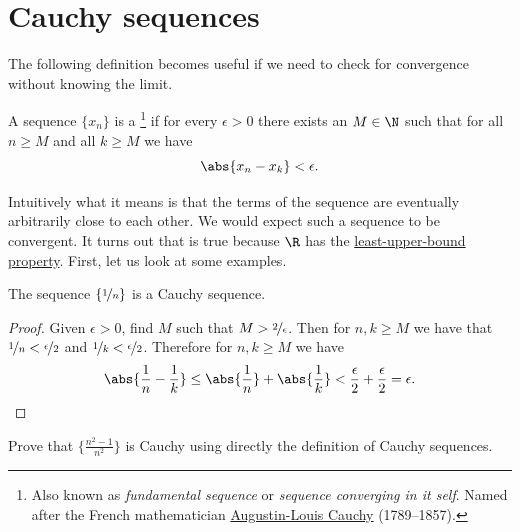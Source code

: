 \documentclass[12pt]{book}
\begin{document}

\sectionnewpage
\section{Cauchy sequences}
\label{sec:cauchy}

The following definition becomes useful if we need to check for convergence without knowing the limit.

\begin{defn}
A sequence $\{ x_n \}$ is a \emph{}%
\footnote{%
Also known as \emph{fundamental sequence} or \emph{sequence converging in it self}. 
Named after the French mathematician
\href{http://en.wikipedia.org/wiki/Cauchy}{Augustin-Louis Cauchy} (1789--1857).} if
for every $\epsilon > 0$ there exists an $M \in \N$ such that
for all $n \geq M$ and all $k \geq M$ we have
\begin{equation*}
\abs{x_n - x_k} < \epsilon .
\end{equation*}
\end{defn}

Intuitively what it means is that the terms of the sequence are eventually
arbitrarily close to each other.
We would expect such a sequence to be
convergent.
It turns out that is true because $\R$ has the
\hyperref[defn:lub]{least-upper-bound property}.
First, let us look at some examples.

\begin{example}
The sequence $\{ \nicefrac{1}{n} \}$ is a Cauchy sequence.

\begin{proof}  Given $\epsilon > 0$, find $M$ such that
$M > \nicefrac{2}{\epsilon}$.
Then for $n,k \geq M$
we have that $\nicefrac{1}{n} < \nicefrac{\epsilon}{2}$
and
$\nicefrac{1}{k} < \nicefrac{\epsilon}{2}$.
Therefore for $n, k \geq M$
we have
\begin{equation*}
\abs{\frac{1}{n} - \frac{1}{k}}
\leq
\abs{\frac{1}{n}} + \abs{\frac{1}{k}}
< \frac{\epsilon}{2} + \frac{\epsilon}{2} = \epsilon.
\end{equation*}
\end{proof}
\end{example}

\begin{exercise}
Prove that $\{ \frac{n^2-1}{n^2} \}$ is Cauchy using directly the definition
of Cauchy sequences.
\end{exercise}
\end{document}

